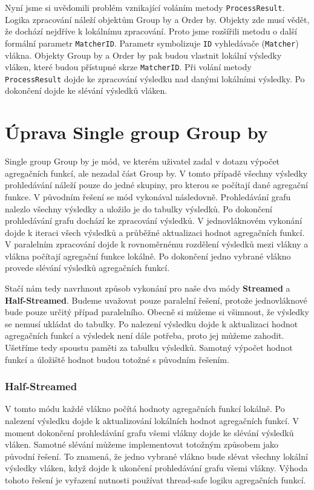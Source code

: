 Nyní jsme si uvědomili problém vznikající voláním metody \texttt{ProcessResult}.
Logika zpracování náleží objektům Group by a Order by.
Objekty zde musí vědět, že dochází nejdříve k lokálnímu zpracování.
Proto jsme rozšířili metodu o další formální parametr \texttt{MatcherID}.
Parametr symbolizuje \texttt{ID} vyhledávače (\texttt{Matcher}) vlákna.
Objekty Group by a Order by pak budou vlastnit lokální výsledky vláken, které budou přístupné skrze \texttt{MatcherID}.
Při volání metody \texttt{ProcessResult} dojde ke zpracování výsledku nad danými lokálními výsledky.
Po dokončení dojde ke slévání výsledků vláken.


\section{Úprava Single group Group by}

Single group Group by je mód, ve kterém uživatel zadal v dotazu výpočet agregačních funkcí, ale nezadal část Group by.
V tomto případě všechny výsledky prohledávání náleží pouze do jedné skupiny, pro kterou se počítají dané agregační funkce.
V původním řešení se mód vykonával následovně.
Prohledávání grafu nalezlo všechny výsledky a uložilo je do tabulky výsledků.
Po dokončení prohledávání grafu dochází ke zpracování výsledků.
V jednovláknovém vykonání dojde k iteraci všech výsledků a průběžné aktualizaci hodnot agregačních funkcí.
V paralelním zpracování dojde k rovnoměrnému rozdělení výsledků mezi vlákny a vlákna počítají agregační funkce lokálně.
Po dokončení jedno vybrané vlákno provede slévání výsledků agregačních funkcí.

Stačí nám tedy navrhnout způsob vykonání pro naše dva módy \textbf{Streamed} a \textbf{Half-Streamed}.
Budeme uvažovat pouze paralelní řešení, protože jednovláknové bude pouze určitý případ paralelního.
Obecně si můžeme si všimnout, že výsledky se nemusí ukládat do tabulky.
Po nalezení výsledku dojde k aktualizaci hodnot agregačních funkcí a výsledek není dále potřeba, proto jej můžeme zahodit.
Ušetříme tedy spoustu paměti za tabulku výsledků.
Samotný výpočet hodnot funkcí a úložiště hodnot budou totožné s původním řešením.

\subsubsection{Half-Streamed}

V tomto módu každé vlákno počítá hodnoty agregačních funkcí lokálně.
Po nalezení výsledku dojde k aktualizování lokálních hodnot agregačních funkcí.
V moment dokončení prohledávání grafu všemi vlákny dojde ke slévání výsledků vláken.
Samotné slévání můžeme implementovat totožným způsobem jako původní řešení.
To znamená, že jedno vybrané vlákno bude slévat všechny lokální výsledky vláken, když dojde k ukončení prohledávání grafu všemi vlákny.
Výhoda tohoto řešení je vyřazení nutnosti používat thread-safe logiku agregačních funkcí.

